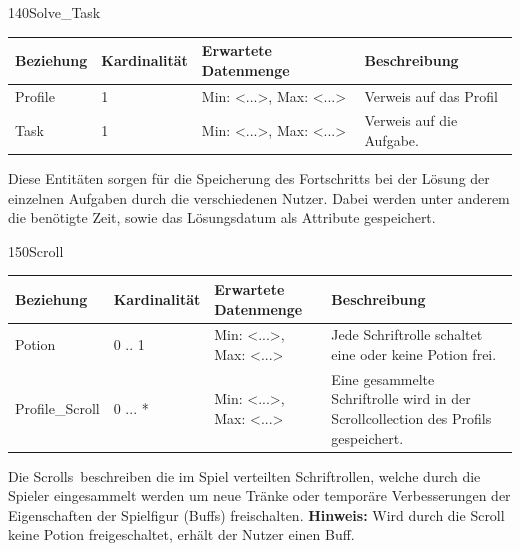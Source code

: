 \begin{entity}{140}{Solve\_Task}
\begin{center}
	\begin{longtable}{|m{4cm}|m{}|m{}|m{}|}
 	 \hline
 	 \textbf{Beziehung} & \textbf{Kardinalität} &  \textbf{Erwartete Datenmenge} & \textbf{Beschreibung} \\
  	\hline
	Profile & 1  & Min: <...>, Max: <...> &  Verweis auf das Profil\\
	  \hline
  	Task & 1  & Min: <...>, Max: <...> & Verweis auf die Aufgabe.\\
	  \hline
	\end{longtable}
\end{center}
Diese Entitäten sorgen für die Speicherung des Fortschritts bei der Lösung der einzelnen Aufgaben durch die verschiedenen Nutzer. Dabei werden unter anderem die benötigte Zeit, sowie das Lösungsdatum als Attribute gespeichert.
\end{entity}

\newpage
\begin{entity}{150}{Scroll}
\begin{center}
	\begin{longtable}{|m{4cm}|m{}|m{}|m{}|}
 	 \hline
 	 \textbf{Beziehung} & \textbf{Kardinalität} &  \textbf{Erwartete Datenmenge} & \textbf{Beschreibung} \\
  	\hline
  	Potion & 0 .. 1  & Min: <...>, Max: <...> & Jede Schriftrolle schaltet eine oder keine Potion frei.\\
	  \hline
	Profile\_Scroll & 0 ... * & Min: <...>, Max: <...> & Eine gesammelte Schriftrolle wird in der Scrollcollection des Profils gespeichert.\\
	  \hline
	\end{longtable}
\end{center}
Die \glqq Scrolls\grqq~beschreiben die im Spiel verteilten Schriftrollen, welche durch die Spieler eingesammelt werden um neue Tränke oder temporäre Verbesserungen der Eigenschaften der Spielfigur (Buffs) freischalten. 
\textbf{Hinweis:} Wird durch die Scroll keine Potion freigeschaltet, erhält der Nutzer einen Buff. \\\\\\\
\end{entity}

